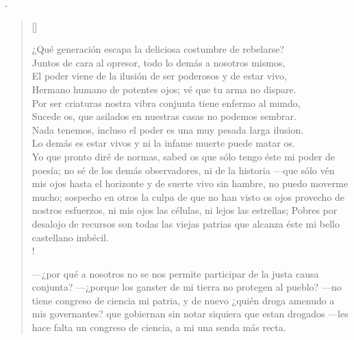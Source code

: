\documentclass[11pt, a4paper]{article} %
\begin{document}
{}.



\settowidth{\versewidth}{DULCE DICHA OCULTA DE LOS QUE SE REBELAN SÓLOS } %

\begin{verse}[\versewidth]
{\scriptsize


¿Qué generación escapa la deliciosa costumbre de rebelarse? \\
Juntos de cara al opresor, todo lo demás a nosotros mismos, \\
El poder viene de la ilusión de ser poderosos y de estar vivo, \\
Hermano humano de potentes ojos; vé que tu arma no dispare. \\
Por ser criaturas nostra vibra conjunta tiene enfermo al mundo, \\
Sucede os, que asilados en nuestras casas no podemos sembrar. \\
Nada tenemos, incluso el poder es una muy pesada larga ilusion. \\
Lo demás es estar vivos y ni la infame muerte puede matar os. \\
Yo que pronto diré de normas, sabed os que sólo tengo éste mi 
poder de poesía; no sé de los demás observadores, ni de la historia 
---que sólo vén mis ojos hasta el horizonte y de suerte vivo sin hambre, 
no puedo moverme mucho; sospecho en otros la culpa de que no 
han visto os ojos provecho de nostros esfuerzos, ni mis ojos las células, 
ni lejos las estrellas;
Pobres por desalojo de recursos son todas las viejas patrias que alcanza éste
\newline mi bello castellano imbécil. \\!

---¿por qué a nosotros no se nos permite participar de la justa causa conjunta? 
---¿porque los ganster de mi tierra no protegen al pueblo? 
---no tiene congreso de ciencia mi patria, y de nuevo ¿quién droga amenudo a mis governantes? 
que gobiernan sin notar siquiera que estan drogados ---les hace falta un congreso de ciencia, 
a mi una senda más recta. 

}
\end{verse}
\end{document}
